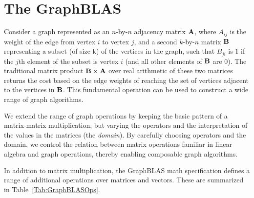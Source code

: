 \section{The GraphBLAS}
\label{sec:math}

Consider a graph represented as an $n$-by-$n$ adjacency matrix ${\bf A}$,
where $A_{ij}$ is the weight of the edge from vertex $i$ to vertex $j$,
and a second $k$-by-$n$ matrix ${\bf B}$ representing a subset (of size k) of the vertices
in the graph, such that $B_{ji}$ is $1$ if the $j$th element of the subset is vertex $i$
(and all other elements of ${\bf B}$ are 0).  The traditional matrix
product ${\bf B} \times {\bf A}$ over real arithmetic of these two matrices returns 
the cost based on the edge weights of reaching the set of vertices
adjacent to the vertices in ${\bf B}$.  This fundamental operation can be
used to construct a wide range of graph algorithms.

We extend the range of graph operations by keeping the basic
pattern of a matrix-matrix multiplication, but varying
the operators and the interpretation of the values in the matrices (the \emph{domain}).
By carefully choosing operators and the domain, we control the
relation between matrix operations familiar in linear algebra and graph operations, thereby enabling
composable graph algorithms.

In addition to matrix multiplication, the GraphBLAS math specification defines
a range of additional operations over matrices and vectors.  These are summarized in Table~\ref{Tab:GraphBLASOps}.

